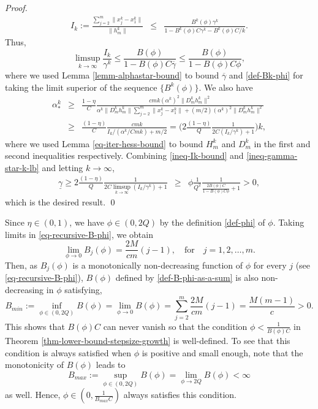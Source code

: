 \documentclass[final,numbook]{svjour3}
\begin{document}
\begin{proof}
\begin{eqnarray*}
I_k := \frac{\sum_{j=2}^m  \|x_j^k - x_1^k\| }{\| h_m^k \|} 
	&\leq& \frac{B^k(\phi)\gamma^k}{1 - B^k(\phi)C\gamma^k - B^k(\phi) C/k}.
 \end{eqnarray*}
Thus, 
\begin{equation}\label{ineq-Ik-bound}
	\limsup_{k\to\infty} \frac{I_k }{\gamma^k} \leq \frac{B(\phi)}{1-B(\phi)C{{\overline{\gamma}}}} \leq \frac{B(\phi)}{1-B(\phi)C\phi}, 
\end{equation}
where we used Lemma \ref{lemm-alphastar-bound} to bound ${{\overline{\gamma}}}$ and \eqref{def-Bk-phi} for taking the limit superior of the sequence $\{B^k(\phi)\}$. We also have 
\begin{eqnarray}
	\alpha_*^k 
	&\geq&  \frac{1-\eta}{C} \frac{{c} mk (\alpha^k)^2 \| D_m^k h_m^k \|^2}{\alpha^k \| D_m^k h_m^k\| \sum_{j=2}^m \|x_j^{k} - x_1^k\| + (m/2) (\alpha^k)^2  \| D_m^k h_m^k\|^2} \nonumber \\
	
	
	&\geq& \frac{(1-\eta)}{C} \frac{{c} mk}{I_k /(\alpha^k/Cmk) + m/2} 
	
	= \bigg(2\frac{(1-\eta)}{Q} \frac{1}{2C (I_k /\gamma^k) + 1}\bigg) k, \label{ineq-gamma-star-k-lb}
\end{eqnarray}
where we used Lemma \ref{eq-iter-hess-bound} to bound $H_m^k$ and $D_m^k$ in the first and second inequalities respectively. Combining \eqref{ineq-Ik-bound} and \eqref{ineq-gamma-star-k-lb} and letting $k \to \infty$,
\begin{eqnarray*} 
  {{\underline{\gamma}}} \geq 2\frac{(1-\eta)}{Q} \frac{1}{2C \limsup_{k\to\infty}(I_k /\gamma^k) + 1} 
   
    &\geq &  \phi \frac{1}{Q^2} \frac{1}{\frac{2B(\phi)C}{1-B(\phi)C\phi} + 1} > 0,
\end{eqnarray*}
which is the desired result. \qed
\end{proof}
\begin{remark}\label{rema-min-B-bound} Since $\eta \in (0,1)$, we have $\phi \in (0,2Q)$ by the definition \eqref{def-phi} of $\phi$. Taking limits in \eqref{eq-recursive-B-phi}, we obtain
  $$\lim_{\phi \to 0} B_j(\phi) = \frac{2M}{cm}(j-1), \quad \mbox{for} \quad j=1,2,\dots,m.$$
Then, as $B_j(\phi)$ is a monotonically non-decreasing function of $\phi$ for every $j$ (see \eqref{eq-recursive-B-phi}), $B(\phi)$ defined by \eqref{def-B-phi-as-a-sum} is also non-decreasing in $\phi$ satisfying,
  $$B_{min} := \inf_{\phi \in(0,2Q) } B(\phi) = \lim_{\phi \to 0} B(\phi) = \sum_{j=2}^m\frac{2M}{cm}(j-1) = \frac{M(m-1)}{c}  > 0.$$
This shows that $B(\phi)C$ can never vanish so that the condition $\phi < \frac{1}{B(\phi)C}$ in Theorem \ref{thm-lower-bound-stepsize-growth} is well-defined. To see that this condition is always satisfied when $\phi$ is positive and small enough, note that the monotonicity of $B(\phi)$ leads to
   $$ B_{max}:=\sup_{\phi \in(0,2Q) } B(\phi) = \lim_{\phi \to 2Q} B(\phi) < \infty$$
as well. Hence, $\phi \in (0,\frac{1}{B_{max} C})$ always satisfies this condition. 
\end{remark}
\medskip
\end{document}
